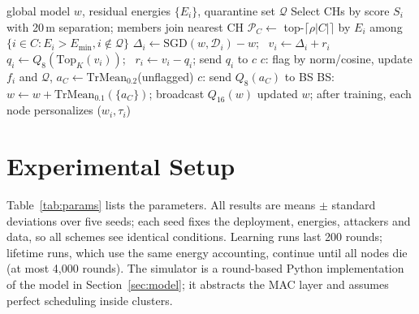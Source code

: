 \documentclass[journal]{IEEEtran}
\begin{document}
\begin{algorithm}[t]
\caption{One EASFL round}\label{alg:easfl}
\begin{algorithmic}[1]
\Require global model $w$, residual energies $\{E_i\}$, quarantine set $\mathcal{Q}$
\State Select CHs by score $S_i$ with 20\,m separation; members join nearest CH
 \State $\mathcal{P}_C\gets$ top-$\lceil\rho|C|\rceil$ by $E_i$ among $\{i\in C: E_i>E_{\min}, i\notin\mathcal{Q}\}$
  
   \State $\Delta_i\gets\mathrm{SGD}(w,\mathcal{D}_i)-w$; \ $v_i\gets\Delta_i+r_i$
   \State $q_i\gets Q_8(\mathrm{Top}_K(v_i))$; \ $r_i\gets v_i-q_i$; send $q_i$ to $c$
 \EndFor
 \State $c$: flag by norm/cosine, update $f_i$ and $\mathcal{Q}$, $a_C\gets\mathrm{TrMean}_{0.2}$(unflagged)
 \State $c$: send $Q_8(a_C)$ to BS
\EndFor
\State BS: $w\gets w+\mathrm{TrMean}_{0.1}(\{a_C\})$; broadcast $Q_{16}(w)$
\Ensure updated $w$; after training, each node personalizes ($w_i,\tau_i$)
\end{algorithmic}
\end{algorithm}

\section{Experimental Setup}\label{sec:setup}
Table~\ref{tab:params} lists the parameters. All results are means $\pm$ standard deviations over five seeds; each seed fixes the deployment, energies, attackers and data, so all schemes see identical conditions. Learning runs last 200 rounds; lifetime runs, which use the same energy accounting, continue until all nodes die (at most 4,000 rounds). The simulator is a round-based Python implementation of the model in Section~\ref{sec:model}; it abstracts the MAC layer and assumes perfect scheduling inside clusters.
\end{document}
